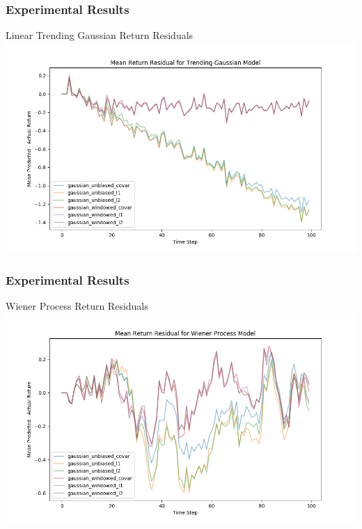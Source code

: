\documentclass{beamer}
\begin{document}
\begin{frame}
    \frametitle{Experimental Results}

    \begin{block}{Linear Trending Gaussian Return Residuals}
        \includegraphics[width=\linewidth]{mean_return_residual-Trending-Gaussian_model.png}
    \end{block}

\end{frame}

\begin{frame}
    \frametitle{Experimental Results}

    \begin{block}{Wiener Process Return Residuals}
        \includegraphics[width=\linewidth]{mean_return_residual-Wiener-Process_model.png}
    \end{block}

\end{frame}
\end{document}
